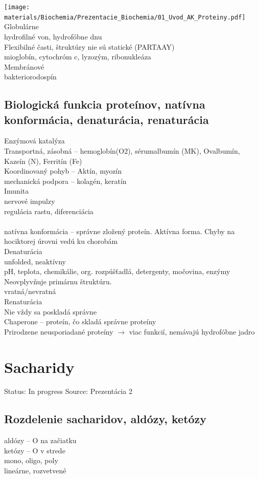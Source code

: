 \texttt{[image: materials/Biochemia/Prezentacie\_Biochemia/01\_Uvod\_AK\_Proteiny.pdf]}
\\
Globulárne\\
\tab hydrofilné von, hydrofóbne dnu\\
\tab Flexibilné časti, štruktúry nie sú statické (PARTAAY)\\
\tab mioglobín, cytochróm c, lyzozým, ribonukleáza\\
Membránové\\
\tab bakteriorodospín\\
\subsection*{Biologická funkcia proteínov, natívna konformácia, denaturácia, renaturácia}
Enzýmová katalýza\\
Transportná, zásobná -- hemoglobín(O2), sérumalbumín (MK), Ovalbumín, Kazeín (N), Ferritín (Fe)\\
Koordinovaný pohyb -- Aktín, myozín\\
mechanická podpora -- kolagén, keratín\\
Imunita\\
nervové impulzy\\
regulácia rastu, diferenciácia\\
\\
natívna konformácia -- správne zložený proteín. Aktívna forma. Chyby na hociktorej úrovni vedú ku chorobám\\
Denaturácia\\
\tab unfolded, neaktívny\\
\tab pH, teplota, chemikálie, org. rozpúšťadlá, detergenty, močovina, enzýmy\\
\tab Neovplyvňuje primárnu štruktúru.\\
\tab vratná/nevratná\\
Renaturácia\\
\tab Nie vždy sa poskladá správne\\
Chaperone -- proteín, čo skladá správne proteíny\\
Prirodzene neusporiadané proteíny $\rightarrow$ viac funkcií, nemávajú hydrofóbne jadro

\section{Sacharidy}
Status: In progress
Source: Prezentácia 2
\\
\subsection*{Rozdelenie sacharidov, aldózy, ketózy}
aldózy -- O na začiatku\\
ketózy -- O v strede\\
mono, oligo, poly\\
lineárne, rozvetvené\\

